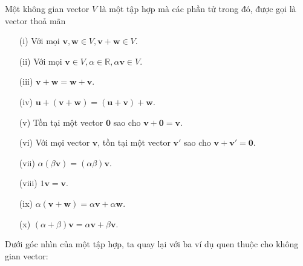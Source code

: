 \begin{definition}\label{def2.2.4}
    Một không gian vector \(V\) là một tập hợp mà các phần tử trong đó, được gọi là vector thoả mãn 
    \begin{enumerate}
        \item[(i)] Với mọi \(\mathbf{v}, \mathbf{w}\in V , \mathbf{v}+\mathbf{w}\in V\).
        \item[(ii)] Với mọi \(\mathbf{v}\in V, \alpha\in \mathbb{R}, \alpha\mathbf{v}\in V\).
        \item[(iii)]  \(\mathbf{v}+\mathbf{w}=\mathbf{w}+\mathbf{v}\).
        \item[(iv)]    \(\mathbf{u}+(\mathbf{v}+\mathbf{w})=(\mathbf{u}+\mathbf{v})+\mathbf{w}\).
        \item[(v)] Tồn tại một vector \(\mathbf{0}\) sao cho \(\mathbf{v}+\mathbf{0}=\mathbf{v}\).
        \item[(vi)] Với mọi vector \(\mathbf{v}\), tồn tại một vector \(\mathbf{v}'\) sao cho \(\mathbf{v}+\mathbf{v}'=\mathbf{0}\).
        \item[(vii)] \(\alpha(\beta\mathbf{v})=(\alpha\beta)\mathbf{v}\).
        \item[(viii)] \(1\mathbf{v}=\mathbf{v}\).
        \item[(ix)]  \(\alpha(\mathbf{v}+\mathbf{w})=\alpha\mathbf{v}+\alpha\mathbf{w}\).
        \item[(x)] \((\alpha+\beta)\mathbf{v}=\alpha\mathbf{v}+\beta\mathbf{v}\).    
    \end{enumerate}
\end{definition}
Dưới góc nhìn của một tập hợp, ta quay lại với ba ví dụ quen thuộc cho không gian vector:
